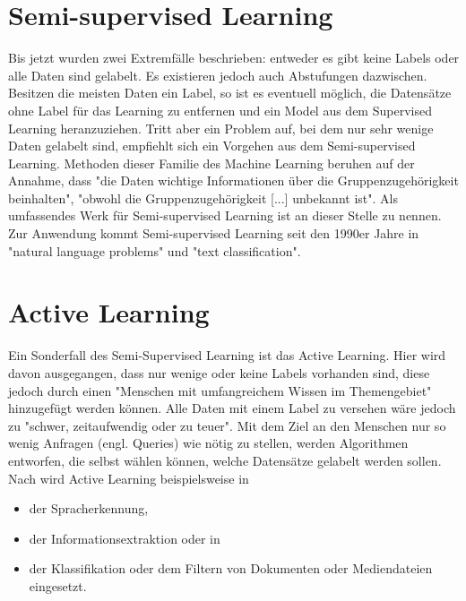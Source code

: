 \section{Semi-supervised Learning}\label{sec:ssl1}
Bis jetzt wurden zwei Extremfälle beschrieben: entweder es gibt keine Labels oder alle Daten sind gelabelt. Es existieren jedoch auch Abstufungen dazwischen. Besitzen die meisten Daten ein Label, so ist es eventuell möglich, die Datensätze ohne Label für das Learning zu entfernen und ein Model aus dem Supervised Learning heranzuziehen. Tritt aber ein Problem auf, bei dem nur sehr wenige Daten gelabelt sind, empfiehlt sich ein Vorgehen aus dem Semi-supervised Learning. Methoden dieser Familie des Machine Learning beruhen auf der Annahme, dass "die Daten wichtige Informationen über die Gruppenzugehörigkeit beinhalten", "obwohl die Gruppenzugehörigkeit [...] unbekannt ist"\citep[S.~223; eigene Übersetzung]{ramasubramanian_machine_2017}. Als umfassendes Werk für Semi-supervised Learning ist an dieser Stelle \citep{chapelle_semi-supervised_2006} zu nennen. \newline
Zur Anwendung kommt Semi-supervised Learning seit den 1990er Jahre in "natural language problems" und "text classification"\citep[S.~4]{chapelle_semi-supervised_2006}.

\section{Active Learning}\label{sec:al1}
Ein Sonderfall des Semi-Supervised Learning ist das Active Learning. Hier wird davon ausgegangen, dass nur wenige oder keine Labels vorhanden sind, diese jedoch durch einen "Menschen mit umfangreichem Wissen im Themengebiet"\citep[S.~i; eigene Übersetzung]{olsson_literature_2009} hinzugefügt werden können. Alle Daten mit einem Label zu versehen wäre jedoch zu "schwer, zeitaufwendig oder zu teuer"\citep[Abstract; eigene Übersetzung]{settles_active_2010}. Mit dem Ziel an den Menschen nur so wenig Anfragen (engl. Queries) wie nötig zu stellen\citep[Abstract]{olsson_literature_2009}, werden Algorithmen entworfen, die selbst wählen können, welche Datensätze gelabelt werden sollen.\citep[Abstract]{settles_active_2010}\newline
Nach \citep[S.~4]{settles_active_2010} wird Active Learning beispielsweise in
\begin{itemize}
\item der Spracherkennung,
\item der Informationsextraktion oder in
\item der Klassifikation oder dem Filtern von Dokumenten oder Mediendateien eingesetzt.
\end{itemize}

